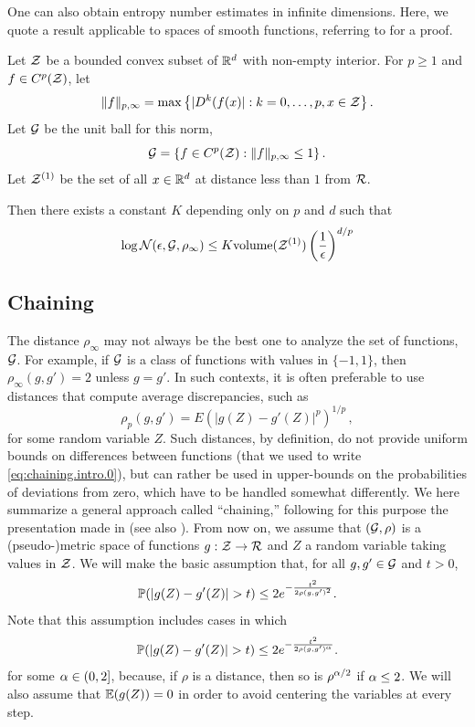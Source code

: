 One can also obtain entropy number estimates in infinite dimensions. Here, we quote a result applicable to spaces of smooth functions, referring to \citet{vander1996Weak} for a proof.
\begin{theorem}
\label{th:entropy.continuous}
Let ${\mathcal Z}$ be a bounded convex subset of ${\mathbb{R}}^d$ with non-empty interior. For $p\geq 1$ and $f\in C^p({\mathcal Z})$, let 
\[
\|f\|_{p, \infty} = \max\left\{  |D^k(f(x)|: k=0, \ldots, p, x\in {\mathcal Z} \right\}.
\]
Let ${\mathcal G}$ be the unit ball for this norm, 
\[
{\mathcal G} = \left\{ f\in C^p({\mathcal Z}): \|f\|_{p, \infty} \leq 1 \right\}.
\]
Let ${\mathcal Z}^{(1)}$ be the set of all $x\in {\mathbb{R}}^d$ at distance less than $1$ from ${\mathcal R}$.

Then there exists a constant $K$ depending only on $p$ and $d$ such that
\[
\log {\mathcal N}(\epsilon, {\mathcal G}, \rho_\infty) \leq K \mathrm{volume}({\mathcal Z}^{(1)})\left(\frac1{\epsilon}\right)^{d/p}
\]
\end{theorem}

\subsection{Chaining}
The distance $\rho_\infty$ may not always be the best one to analyze the set of functions, ${\mathcal G}$. For example, if ${\mathcal G}$ is a class of functions with values in $\{-1,1\}$, then $\rho_{\infty}(g,g') = 2$ unless $g=g'$.  In such contexts, it is often preferable to use distances that compute average discrepancies, such as
\begin{equation}
\label{eq:rho.p}
\rho_p(g,g') = E(|g(Z) - g'(Z)|^p)^{1/p}\,,
\end{equation}
for some random variable $Z$.
Such distances, by definition, do not provide uniform bounds on differences between functions (that we used to write \cref{eq:chaining.intro.0}), but can rather be used in upper-bounds on the probabilities of deviations from zero, which have to be handled somewhat differently. We here summarize a general approach called ``chaining,''  following for this purpose the presentation made in \citet{talagrand2014upper} (see also \citet{audibert2007combining}). From now on,  we assume that
 $({\mathcal G}, \rho)$ is a (pseudo-)metric space of functions $g: {\mathcal Z} \to {\mathcal R}$ and $Z$ a random variable taking values in ${\mathcal Z}$. 
We will make the basic assumption that, for all $g,g'\in{\mathcal G}$ and $t>0$,
\[
\bm{\mathbb P}(|g(Z) - g'(Z)| > t)\leq 2 e^{-\frac{t^2}{2\rho(g,g')^2}}.
\]
Note that this assumption includes cases in which
\[
\bm{\mathbb P}(|g(Z) - g'(Z)| > t)\leq 2 e^{-\frac{t^2}{2\rho(g,g')^\alpha}}.
\]
for some $\alpha\in (0, 2]$, because, if $\rho$ is a distance, then so is $\rho^{\alpha/2}$ if $\alpha\leq 2$.
We will also assume that $\bm{\mathbb E}(g(Z)) = 0$ in order to avoid centering the variables at every step. 

